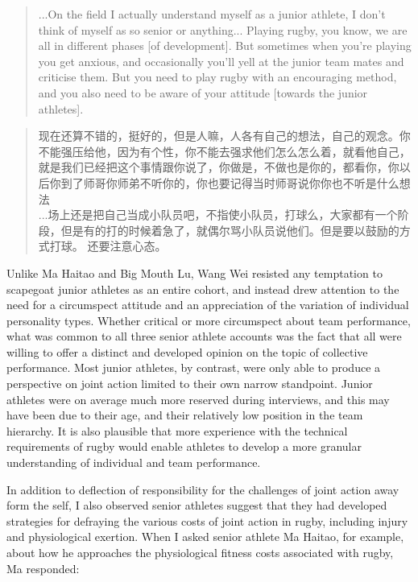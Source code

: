 \begin{CJK}{UTF8}{gbsn}
\begin{quote}
   ...On the field I actually understand myself as a junior athlete,  I don't think of myself as so senior or anything... Playing rugby, you know, we are all in different phases [of development].  But sometimes when you're playing you get anxious, and occasionally you'll yell at the junior team mates and criticise them.  But you need to play rugby with an encouraging method, and you also need to be aware of your attitude [towards the junior athletes].
\end{quote}

\begin{quote}
  	现在还算不错的，挺好的，但是人嘛，人各有自己的想法，自己的观念。你不能强压给他，因为有个性，你不能去强求他们怎么怎么着，就看他自己，就是我们已经把这个事情跟你说了，你做是，不做也是你的，都看你，你以后你到了师哥你师弟不听你的，你也要记得当时师哥说你你也不听是什么想法
\\
    ...场上还是把自己当成小队员吧，不指使小队员，打球么，大家都有一个阶段，但是有的打的时候着急了，就偶尔骂小队员说他们。但是要以鼓励的方式打球。 还要注意心态。
\end{quote}

Unlike Ma Haitao and Big Mouth Lu, Wang Wei resisted any temptation to scapegoat junior athletes as an entire cohort, and instead drew attention to the need for a circumspect attitude and an appreciation of the variation of individual personality types.  Whether critical or more circumspect about team performance, what was common to all three senior athlete accounts was the fact that all were willing to offer a distinct and developed opinion on the topic of collective performance. Most junior athletes, by contrast, were only able to produce a perspective on joint action limited to their own narrow standpoint.  Junior athletes were on average much more reserved during interviews, and this may have been due to their age, and their relatively low position in the team hierarchy.  It is also plausible that more experience with the technical requirements of rugby would enable athletes to develop a more granular understanding of individual and team performance.


In addition to deflection of responsibility for the challenges of joint action away form the self, I also observed senior athletes suggest that they had developed strategies for defraying the various costs of joint action in rugby, including injury and physiological exertion.  When I asked senior athlete Ma Haitao, for example, about how he approaches the physiological fitness costs associated with rugby, Ma responded:


\end{CJK}
